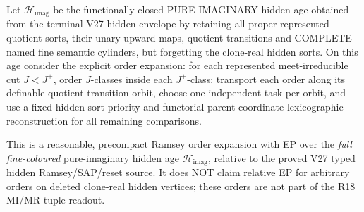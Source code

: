 \begin{theorem}
\label{thm:ep-terminal-orders}
Let \(\mathcal H_{\mathrm{imag}}\) be the
functionally closed PURE-IMAGINARY hidden
age obtained from the terminal V27 hidden
envelope by retaining all proper represented
quotient sorts, their unary upward maps,
quotient transitions and COMPLETE named
fine semantic cylinders, but forgetting
the clone-real hidden sorts. On this age
consider the explicit order expansion:
for each represented meet-irreducible cut
\(J<J^+\), order \(J\)-classes inside
each \(J^+\)-class; transport each order
along its definable quotient-transition
orbit, choose one independent task per
orbit, and use a fixed hidden-sort priority
and functorial parent-coordinate
lexicographic reconstruction for all
remaining comparisons.

This is a reasonable, precompact Ramsey
order expansion with EP over the
\emph{full fine-coloured} pure-imaginary
hidden age \(\mathcal H_{\mathrm{imag}}\),
relative to the proved V27 typed hidden
Ramsey/SAP/reset source. It does NOT
claim relative EP for arbitrary orders
on deleted clone-real hidden vertices;
these orders are not part of the R18
MI/MR tuple readout.
\end{theorem}
